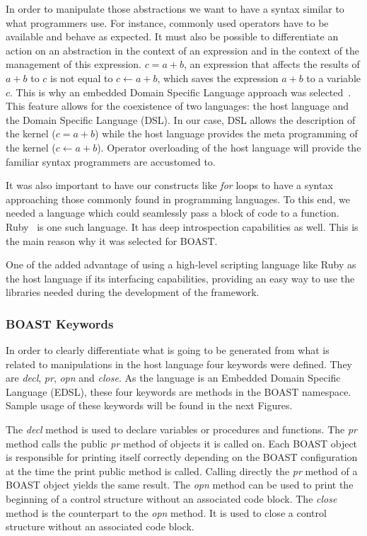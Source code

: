 \documentclass{IEEEtran}
\begin{document}
In order to manipulate those abstractions we want to have a syntax similar to 
what programmers use. For instance, commonly used operators have to be
available and behave as expected. It must also be possible to differentiate an
action on an abstraction in the context of an expression and in the context of
the management of this expression. $c = a + b$, an expression that affects the
results of $a + b$ to $c$  is not equal to $c \leftarrow a + b$, which saves
the expression $a + b$ to a variable $c$. This is why an embedded Domain
Specific Language approach was selected~\cite{hudak1996building}. This feature
allows for the coexistence of two languages: the host language and the Domain
Specific Language (DSL).  In our case, DSL allows the description of the kernel
($c = a + b$) while the host language provides the meta programming of the
kernel ($c \leftarrow a + b$). Operator overloading of the host language will
provide the familiar syntax programmers are accustomed to.

It was also important to have our constructs like \emph{for} loops to have a
syntax approaching those commonly found in programming languages. To this end,
we needed a language which could seamlessly pass a block of code to a function.
Ruby~\cite{matsumoto2002ruby} is one such language. It has deep introspection
capabilities as well. This is the main reason why it was selected for BOAST.

One of the added advantage of using a high-level scripting language like Ruby
as the host language if its interfacing capabilities, providing an easy way to
use the libraries needed during the development of the framework.

\subsubsection{BOAST Keywords}

In order to clearly differentiate what is going to be generated from what is
related to manipulations in the host language four keywords were defined. They
are \emph{decl}, \emph{pr}, \emph{opn} and \emph{close}. As the language is an
Embedded Domain Specific Language (EDSL), these four keywords are methods in
the BOAST namespace. Sample usage of these keywords will be found in the next
Figures.

The \emph{decl} method is used to declare variables or procedures and functions. 
The \emph{pr} method calls the public \emph{pr} method of objects it is
called on. Each BOAST object is responsible for printing itself correctly
depending on the BOAST configuration at the time the print public method is
called. Calling directly the \emph{pr} method of a BOAST object yields the same
result. The \emph{opn} method can be used to print the beginning of a control
structure without an associated code block.
The \emph{close} method is the counterpart to the \emph{opn} method. It is used
to close a control structure without an associated code block.
\end{document}
